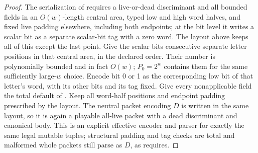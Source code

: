 \begin{proof}

The serialization of \cite[Section~\ref*{cl:sec:packets}]{DMNoise1D2026} requires a live-or-dead discriminant and all bounded fields in an \(O(w)\)-length central area, typed low and high word halves, and fixed live padding elsewhere, including both endpoints; at the bit level it writes a scalar bit as a separate scalar-bit tag with a zero word. The layout above keeps all of this except the last point. Give the scalar bits consecutive separate letter positions in that central area, in the declared order. Their number is polynomially bounded and in fact \(O(w)\); \(P_0=2^{w}\) contains them for the same sufficiently large-\(w\) choice. Encode bit 0 or 1 as the corresponding low bit of that letter's word, with its other bits and its tag fixed. Give every nonapplicable field the total default of \cite[Section~\ref*{cl:sec:packets}]{DMNoise1D2026}. Keep all word-half positions and endpoint padding prescribed by the layout. The neutral packet encoding \(D\) is written in the same layout, so it is again a playable all-live packet with a dead discriminant and canonical body. This is an explicit effective encoder and parser for exactly the same legal mutable tuples; structural padding and tag checks are total and malformed whole packets still parse as \(D\), as \cite[Section~\ref*{cl:sec:packets}]{DMNoise1D2026} requires.


\end{proof}
